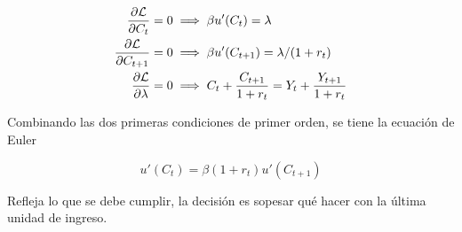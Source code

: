 \begin{align}
    \frac{\partial {\cal L}}{\partial C_{t}}  = 0 & \implies \beta u'(C_{t}) =\lambda\\
    \frac{\partial {\cal L}}{\partial C_{t+1}}  = 0 & \implies \beta u'(C_{t+1}) =\lambda/(1+r_{t}) \\
    \frac{\partial {\cal L}}{\partial \lambda}  = 0 & \implies  C_{t}+\frac{C_{t+1}}{1+r_{t}} = Y_{t}+\frac{Y_{t+1}}{1+r_{t}}
\end{align}

Combinando las dos primeras condiciones de primer orden, se tiene la ecuación de Euler

\begin{equation}
    u'(C_{t})=\beta(1+r_{t})u'(C_{t+1})
\end{equation}

Refleja lo que se debe cumplir, la decisión es sopesar qué hacer con la última unidad de ingreso. 